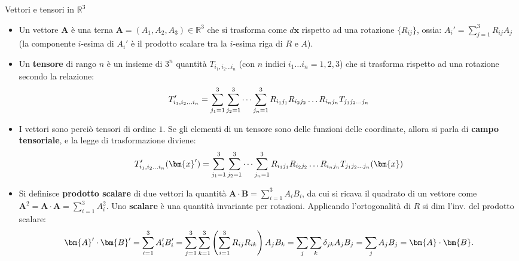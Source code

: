 \documentclass[a4_2,grid,frame]{flashcards}
\newenvironment{cartaflash}
    {\vspace{-15pt}
    \begin{itemize}
    }
    {
    \end{itemize}
    }
\begin{document}
\begin{flashcard}[Definizione]{Vettori e tensori in $\mathbb{R}^3$}
\begin{cartaflash}
\item Un vettore $\bm{A}$ è una terna $\bm{A} = (A_1, A_2, A_3) \in \mathbb{R}^3$ che si trasforma come $d\bm{x}$ rispetto ad una rotazione $\{ R_{ij} \}$, ossia: $A_i'=\sum_{j=1}^3 R_{ij} A_j$ (la componente $i$-esima di $A_i'$ è il prodotto scalare tra la $i$-esima riga di $R$ e $A$). 
\vspace{-8pt}
\item Un \textbf{tensore} di rango $n$ è un insieme di $3^n$ quantità $T_{i_1, i_2 \dots i_n}$ (con $n$ indici $i_1\dots i_n = 1,2,3$) che si trasforma rispetto ad una rotazione secondo la relazione:
\vspace{-10pt}
\[
T'_{i_1,i_2\dots i_n} = \sum_{j_1=1}^3\sum_{j_2=1}^3\dots \sum_{j_n=1}^3 R_{i_1 j_1}R_{i_2 j_2}\dots R_{i_n j_n} T_{j_1 j_2 \dots j_n}
\vspace{-13pt}
\]
\vspace{-8pt}
\item I vettori sono perciò tensori di ordine $1$. Se gli elementi di un tensore sono delle funzioni delle coordinate, allora si parla di \textbf{campo tensoriale}, e la legge di trasformazione diviene: 
\vspace{-10pt}
\[
T'_{i_1,i_2\dots i_n}(\bm{x}') = \sum_{j_1=1}^3\sum_{j_2=1}^3\dots \sum_{j_n=1}^3 R_{i_1 j_1}R_{i_2 j_2}\dots R_{i_n j_n} T_{j_1 j_2 \dots j_n}(\bm{x})
\vspace{-8pt}
\]
\vspace{-8pt}
\item Si definisce \textbf{prodotto scalare} di due vettori la quantità $\bm{A}\cdot \bm{B} = \sum_{i=1}^3 A_i B_i$, da cui si ricava il quadrato di un vettore come $\bm{A}^2 = \bm{A}\cdot \bm{A} = \sum_{i=1}^3 A_i^2$. Uno \textbf{scalare} è una quantità invariante per rotazioni. Applicando l'ortogonalità di $R$ si dim l'inv. del prodotto scalare:
\vspace{-8pt}
\[
\bm{A}'\cdot \bm{B}' = \sum_{i=1}^3 A_i' B_i' = \sum_{j=1}^3\sum_{k=1}^3 \left (\sum_{i=1}^3 R_{ij} R_{ik} \right ) A_j B_k = \sum_{j}\sum_{k} \delta_{jk} A_j B_j = \sum_j A_j B_j = \bm{A}\cdot \bm{B}. 
\vspace{-8pt}
\]
\end{cartaflash}
\end{flashcard}
\end{document}
